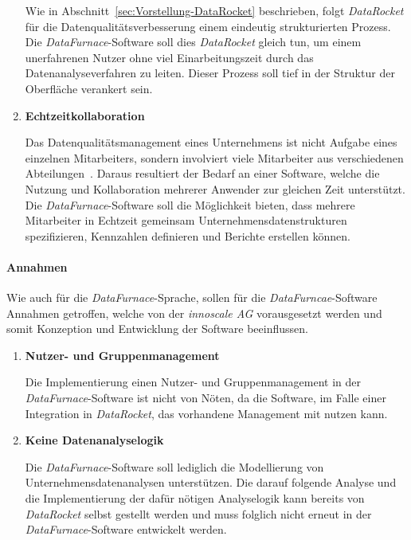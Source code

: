 \documentclass[
  language=german, %
  type=bachelor%
]{isthesis}
\begin{document}
\begin{content}
\begin{enumerate}
      Wie in Abschnitt~\ref{sec:Vorstellung-DataRocket} beschrieben, folgt
      \textit{DataRocket} für die Datenqualitätsverbesserung einem eindeutig
      strukturierten Prozess. Die \textit{DataFurnace}-Software soll dies
      \textit{DataRocket} gleich tun, um einem unerfahrenen Nutzer ohne viel
      Einarbeitungszeit durch das Datenanalyseverfahren zu leiten. Dieser
      Prozess soll tief in der Struktur der Oberfläche verankert sein.

    \item \textbf{Echtzeitkollaboration}

			Das Datenqualitätsmanagement eines Unternehmens ist nicht Aufgabe eines
			einzelnen Mitarbeiters, sondern involviert viele Mitarbeiter aus
			verschiedenen Abteilungen~\cite[][S. 2]{geiger2004data}. Daraus resultiert der
			Bedarf an einer Software, welche die Nutzung und Kollaboration mehrerer
			Anwender zur gleichen Zeit unterstützt. Die \textit{DataFurnace}-Software
			soll die Möglichkeit bieten, dass mehrere Mitarbeiter in Echtzeit gemeinsam
			Unternehmensdatenstrukturen spezifizieren, Kennzahlen
			definieren und Berichte erstellen können.
      
  \end{enumerate}


	\paragraph{Annahmen} Wie auch für die \textit{DataFurnace}-Sprache, sollen
	für die \textit{DataFurncae}-Software Annahmen getroffen, welche von der
	\textit{innoscale AG} vorausgesetzt werden und somit Konzeption und
	Entwicklung der Software beeinflussen.

  \begin{enumerate}
    \item \textbf{Nutzer- und Gruppenmanagement}

		Die Implementierung einen Nutzer- und Gruppenmanagement in der
		\textit{DataFurnace}-Software ist nicht von Nöten, da die Software, im
		Falle einer Integration in \textit{DataRocket}, das vorhandene Management
		mit nutzen kann.

    \item \textbf{Keine Datenanalyselogik}

			Die \textit{DataFurnace}-Software soll lediglich die Modellierung von
			Unternehmensdatenanalysen unterstützen. Die darauf folgende Analyse und
			die Implementierung der dafür nötigen Analyselogik kann bereits von \textit{DataRocket}
			selbst gestellt werden und muss folglich nicht erneut in der
			\textit{DataFurnace}-Software entwickelt werden.
  \end{enumerate}


\end{content}
\end{document}
